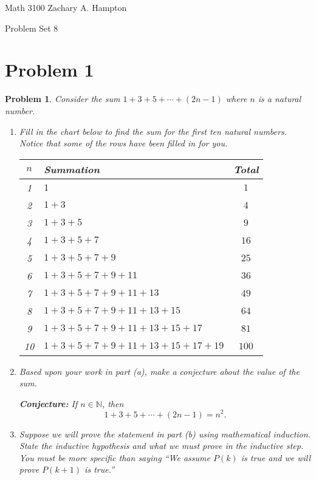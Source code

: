 \documentclass[12pt]{article}
\newtheorem{problem}{Problem}
\theoremstyle{definition}
\begin{document}
Math 3100 \hfill Zachary A. Hampton

Problem Set 8 \hfill 
{}

\bigskip

\section*{Problem 1}

\begin{problem}
Consider the sum \(1 + 3 + 5 + \cdots + (2n - 1)\) where \(n\) is a natural number.

\begin{enumerate}[label=(\alph*)]
    \item Fill in the chart below to find the sum for the first ten natural numbers. Notice that some of the rows have been filled in for you.
    
    \begin{center}
    \begin{tabular}{|c|l|c|}
    \hline
    \(n\) & Summation & Total \\
    \hline
    1 & \(1\) & \(1\) \\
    2 & \(1 + 3\) & \(4\) \\
    3 & \(1 + 3 + 5\) & \(9\) \\
    4 & \(1 + 3 + 5 + 7\) & \(16\) \\
    5 & \(1 + 3 + 5 + 7 + 9\) & \(25\) \\
    6 & \(1 + 3 + 5 + 7 + 9 + 11\) & \(36\) \\
    7 & \(1 + 3 + 5 + 7 + 9 + 11 + 13\) & \(49\) \\
    8 & \(1 + 3 + 5 + 7 + 9 + 11 + 13 + 15\) & \(64\) \\
    9 & \(1 + 3 + 5 + 7 + 9 + 11 + 13 + 15 + 17\) & \(81\) \\
    10 & \(1 + 3 + 5 + 7 + 9 + 11 + 13 + 15 + 17 + 19\) & \(100\) \\
    \hline
    \end{tabular}
    \end{center}
    
    \item Based upon your work in part (a), make a conjecture about the value of the sum.
    
    \textbf{Conjecture:} If \( n \in \mathbb{N} \), then
    \[
    1 + 3 + 5 + \cdots + (2n - 1) = n^2.
    \]
    
    \item Suppose we will prove the statement in part (b) using mathematical induction. State the inductive hypothesis and what we must prove in the inductive step. You must be more specific than saying “We assume \( P(k) \) is true and we will prove \( P(k + 1) \) is true.”
    

\end{enumerate}
\end{problem}
\end{document}
